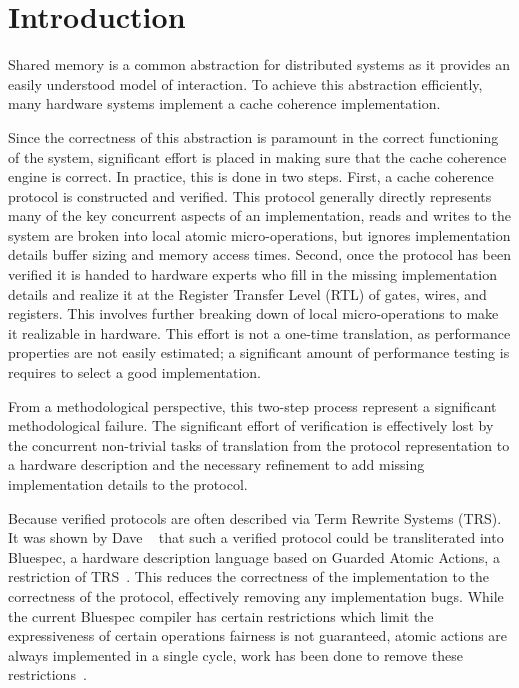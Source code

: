 \section{Introduction}
\label{sec:Introduction}

Shared memory is a common abstraction for distributed systems as it
provides an easily understood model of interaction. To achieve this
abstraction efficiently, many hardware systems implement a cache
coherence implementation. 

Since the correctness of this abstraction is paramount in the correct
functioning of the system, significant effort is placed in making sure
that the cache coherence engine is correct. In practice, this is done
in two steps. First, a cache coherence protocol is constructed and
verified. This protocol generally directly represents many of
the key concurrent aspects of an implementation, \eg{} reads and
writes to the system are broken into local atomic micro-operations, but
ignores implementation details \eg{} buffer sizing and memory access
times. Second, once the protocol has been verified it is handed to
hardware experts who fill in the missing implementation details and
realize it at the Register Transfer Level (RTL) of gates, wires, and
registers. This involves further breaking down of local micro-operations to
make it realizable in hardware. This effort is not a one-time translation, as
performance properties are not easily estimated; a significant amount of
performance testing is requires to select a good implementation. 

From a methodological perspective, this two-step process represent a
significant methodological failure. The significant effort of
verification is effectively lost by the concurrent non-trivial tasks
of translation from the protocol representation to a hardware
description and the necessary refinement to add missing implementation
details to the protocol. 

Because verified protocols are often described via Term Rewrite
Systems (TRS). It was shown by Dave
\etal{}~\cite{DNA:CoherenceImplementation} that such a verified
protocol could be transliterated into Bluespec, a hardware description
language based on Guarded Atomic Actions, a restriction of
TRS~\cite{Hoe:TCAD}. This reduces the correctness of the
implementation to the correctness of the protocol, effectively
removing any implementation bugs. While the current Bluespec compiler
has certain restrictions which limit the expressiveness of certain
operations \eg{} fairness is not guaranteed, atomic actions are always
implemented in a single cycle, work has been done to remove these
restrictions~\cite{DNA:CoherenceImplementation, Karczmarek}.

